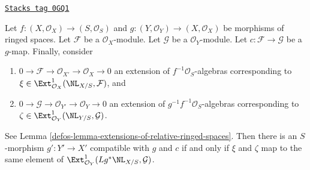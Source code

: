 \begin{lemma}
\label{defos-lemma-extensions-of-relative-ringed-spaces-functorial}
\href{https://stacks.math.columbia.edu/tag/0GQ1}{\texttt{Stacks tag 0GQ1}}

Let $f : (X, \mathcal{O}_X) \to (S, \mathcal{O}_S)$ and
$g : (Y, \mathcal{O}_Y) \to (X, \mathcal{O}_X)$ be morphisms
of ringed spaces. Let $\mathcal{F}$ be a $\mathcal{O}_X$-module.
Let $\mathcal{G}$ be a $\mathcal{O}_Y$-module. Let
$c : \mathcal{F} \to \mathcal{G}$ be a $g$-map. Finally, consider
\begin{enumerate}
\item[(a)] $0 \to \mathcal{F} \to \mathcal{O}_{X'} \to \mathcal{O}_X \to 0$
an extension of $f^{-1}\mathcal{O}_S$-algebras
corresponding to $\xi \in \Ext^1_{\mathcal{O}_X}(\NL_{X/S}, \mathcal{F})$, and
\item[(b)] $0 \to \mathcal{G} \to \mathcal{O}_{Y'} \to \mathcal{O}_Y \to 0$
an extension of $g^{-1}f^{-1}\mathcal{O}_S$-algebras
corresponding to $\zeta \in \Ext^1_{\mathcal{O}_Y}(\NL_{Y/S}, \mathcal{G})$.
\end{enumerate}
See Lemma \ref{defos-lemma-extensions-of-relative-ringed-spaces}.
Then there is an $S$-morphism $g' : Y' \to X'$
compatible with $g$ and $c$ if and only if $\xi$ and $\zeta$
map to the same element of
$\Ext^1_{\mathcal{O}_Y}(Lg^*\NL_{X/S}, \mathcal{G})$.
\end{lemma}

